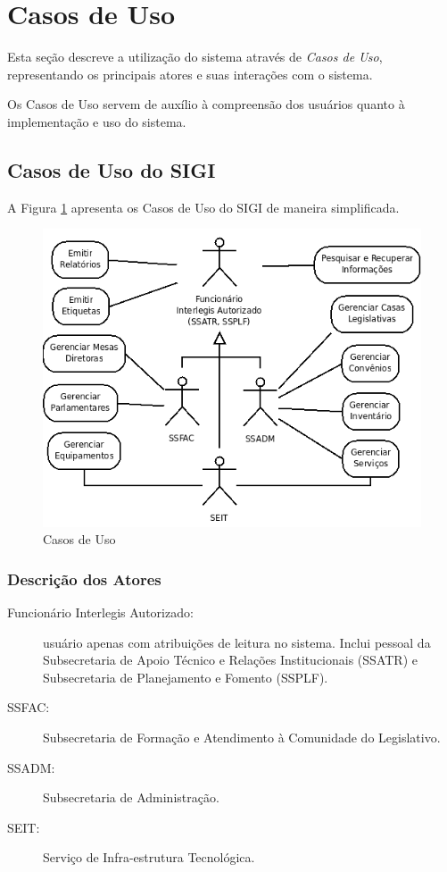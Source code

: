 %
%

\section{Casos de Uso}
\label{sec:casos}

Esta seção descreve a utilização do sistema através de \emph{Casos de
  Uso}, representando os principais atores e suas interações com o
sistema.

Os Casos de Uso servem de auxílio à compreensão dos usuários quanto à
implementação e uso do sistema.

\subsection{Casos de Uso do SIGI}
A Figura \ref{fig:casos} apresenta os Casos de Uso do SIGI de maneira
simplificada.

\begin{figure}[h]
  \centering
  \includegraphics[width=120mm]{../imagens/casosdeuso.png}
  \caption{Casos de Uso}
  \label{fig:casos}
\end{figure}

\subsubsection{Descrição dos Atores}
\begin{description}
\item[Funcionário Interlegis Autorizado:] usuário apenas com
  atribuições de leitura no sistema. Inclui pessoal da Subsecretaria
  de Apoio Técnico e Relações Institucionais (SSATR) e Subsecretaria
  de Planejamento e Fomento (SSPLF).
\item[SSFAC:] Subsecretaria de Formação e Atendimento à Comunidade do
  Legislativo.
\item[SSADM:] Subsecretaria de Administração.
\item[SEIT:] Serviço de Infra-estrutura Tecnológica.
\end{description}

